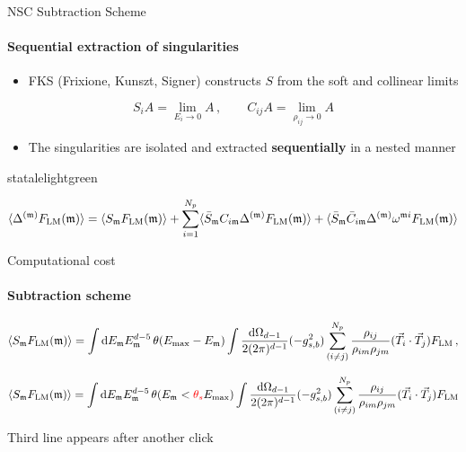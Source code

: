 \begin{frame} {NSC Subtraction Scheme}
   \framesubtitle{Sequential extraction of singularities}

\begin{itemize}
    \item FKS (Frixione, Kunszt, Signer) constructs $S$ from the soft and collinear limits
\end{itemize}

\begin{equation*}
    S_i A = \lim_{E_i \to 0} A \, , \qquad C_{ij}A = \lim_{\rho_{ij}\to 0}A 
\end{equation*}

\begin{itemize}
    \item The singularities are isolated and extracted \textbf{sequentially} in a nested manner
\end{itemize}

 \begin{colorblock}[black]{statalelightgreen}{}
 \begin{center}
\begin{equation*}
  \langle \Delta^{(\mathfrak{m})}F_{\mathrm{LM}}(\mathfrak{m}) \rangle = \langle S_{\mathfrak{m}}F_{\mathrm{LM}}(\mathfrak{m}) \rangle + \sum_{i=1}^{N_p} \langle \bar{S}_{\mathfrak{m}}C_{i\mathfrak{m}} \Delta^{(\mathfrak{m})} F_{\mathrm{LM}}(\mathfrak{m}) \rangle + \langle \bar{S}_{\mathfrak{m}} \bar{C}_{i\mathfrak{m}} \Delta^{(\mathfrak{m})} \omega^{\mathfrak{m} i} F_{\mathrm{LM}}(\mathfrak{m}) \rangle
\end{equation*}
  \end{center}
\end{colorblock}


\end{frame}


\begin{frame} {Computational cost}
  \framesubtitle{Subtraction scheme}

\begin{equation*}
  \langle S_{\mathfrak{m}} F_{\mathrm{LM}} (\mathfrak{m}) \rangle = \int \mathrm{d}E_{\mathfrak{m}} E_{\mathfrak{m}}^{d-5} \, \theta(E_{\mathrm{max}}-E_{\mathfrak{m}})  \int \frac{\mathrm{d}\Omega_{d-1}}{2 (2 \pi)^{d-1}} (-g_{s,b}^2) \sum_{(i \neq j)}^{N_p} \frac{\rho_{ij}}{\rho_{im}\rho_{jm}} (\vec{T}_i \cdot \vec{T}_j) F_{\mathrm{LM}} \, ,
\end{equation*}

\pause
\begin{equation*}
  \langle S_{\mathfrak{m}} F_{\mathrm{LM}} (\mathfrak{m}) \rangle = \int \mathrm{d}E_{\mathfrak{m}} E_{\mathfrak{m}}^{d-5} \, \theta(E_{\mathfrak{m}} < \textcolor{red}{\theta_s} E_{\mathrm{max}})  \int \frac{\mathrm{d}\Omega_{d-1}}{2 (2 \pi)^{d-1}} (-g_{s,b}^2) \sum_{(i \neq j)}^{N_p} \frac{\rho_{ij}}{\rho_{im}\rho_{jm}} (\vec{T}_i \cdot \vec{T}_j) F_{\mathrm{LM}} 
\end{equation*}

\pause
Third line appears after another click



\end{frame}

